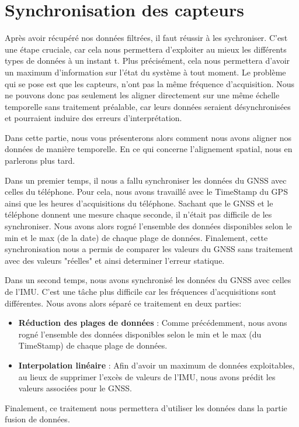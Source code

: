 \section{Synchronisation des capteurs}
Après avoir récupéré nos données filtrées, il faut réussir à les sychroniser. C'est une étape cruciale, car cela nous permettera d'exploiter au mieux les différents types de données à un instant t. Plus précisément, cela nous permettera d'avoir un maximum d'information sur l'état du système à tout moment. Le problème qui se pose est que les capteurs, n'ont pas la même fréquence d'acquisition. Nous ne pouvons donc pas seulement les aligner directement sur une même échelle temporelle sans traitement préalable, car leurs données seraient désynchronisées et pourraient induire des erreurs d’interprétation.

Dans cette partie, nous vous présenterons alors comment nous avons aligner nos données de manière temporelle. En ce qui concerne l'alignement spatial, nous en parlerons plus tard.

Dans un premier temps, il nous a fallu synchroniser les données du GNSS avec celles du téléphone. Pour cela, nous avons travaillé avec le TimeStamp du GPS ainsi que les heures d'acquisitions du téléphone. Sachant que le GNSS et le téléphone donnent une mesure chaque seconde, il n'était pas difficile de les synchroniser. Nous avons alors rogné l'ensemble des données disponibles selon le min et le max (de la date) de chaque plage de données.
Finalement, cette synchronisation nous a permis de comparer les valeurs du GNSS sans traitement avec des valeurs "réelles" et ainsi determiner l'erreur statique.

Dans un second temps, nous avons synchronisé les données du GNSS avec celles de l'IMU. C'est une tâche plus difficile car les fréquences d'acquisitions sont différentes. Nous avons alors séparé ce traitement en deux parties:
\begin{itemize}
    \item \textbf{Réduction des plages de données} : Comme précédemment, nous avons rogné l'ensemble des données disponibles selon le min et le max (du TimeStamp) de chaque plage de données.
    \item \textbf{Interpolation linéaire} : Afin d'avoir un maximum de données exploitables, au lieux de supprimer l'excès de valeurs de l'IMU, nous avons prédit les valeurs associées pour le GNSS.
\end{itemize}
Finalement, ce traitement nous permettera d'utiliser les données dans la partie fusion de données.

